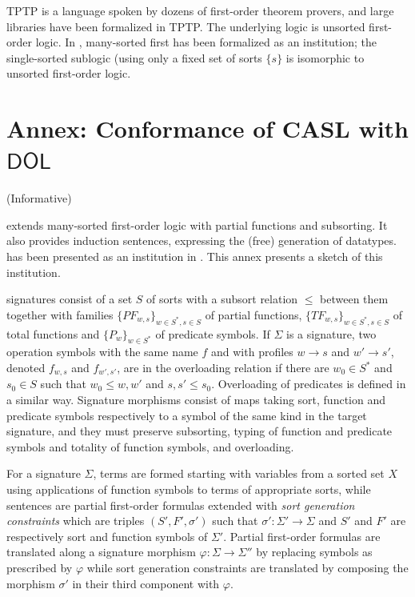 \documentclass[10pt,fleqn,final]{scrreprt}
\newcommand*{\DOL}{\ensuremath{\mathsf{DOL}}\xspace}
\newcommand{\informative}[0]{{\begin{center}{\Large{(Informative})}\end{center}} \bigskip}
\newcommand{\infannex}[1]{ \chapter{Annex: #1}  \informative }
\newenvironment{definitions}[0]{\medskip }{}
\begin{document}
\begin{definitions}
TPTP \cite{TPTP,DBLP:conf/cade/SutcliffeSY94,DBLP:journals/jar/Sutcliffe09}
is a language spoken by dozens of first-order theorem provers,
and large libraries have been formalized in TPTP.
The underlying logic is unsorted first-order logic. In 
\cite{GoguenBurstall92}, many-sorted first has been formalized as
an institution; the single-sorted sublogic (using only a fixed
set of sorts $\{s\}$ is isomorphic to unsorted first-order logic.

\infannex{Conformance of CASL with \DOL}\label{a:casl}


\CASL \cite{CASL-RM} extends many-sorted first-order logic with
partial functions and subsorting.  It also provides induction
sentences, expressing the (free) generation of datatypes.  \CASL has
been presented as an institution in \cite{Mossakowski02,CASL-RM}. This annex presents
a sketch of this institution.

\CASL signatures consist of a set $S$ of sorts with a subsort relation $\leq$ between them
together with
families $\{PF_{w,s}\}_{w\in S^*, s\in S}$ of partial functions,
$\{TF_{w,s}\}_{w\in S^*, s\in S}$ of total functions and
$\{P_w\}_{w\in S^*}$ of predicate symbols. 
If $\Sigma$ is a signature, 
two operation symbols with the same name $f$ and with profiles
$w\rightarrow s$ and $w'\rightarrow s'$, denoted $f_{w,s}$ and $f_{w',s'}$, are in the
overloading relation if there are $w_0\in S^*$ and $s_0\in S$ such
that $w_0\leq w, w'$ and $s,s' \leq s_0$. Overloading of predicates is defined in a similar way.
Signature morphisms consist of maps taking sort, function and predicate symbols
respectively to a symbol of the same kind in the target signature, and they 
must preserve subsorting, typing of function and predicate symbols and totality of function symbols,
 and overloading. 

For a signature $\Sigma$, terms are formed starting with
variables from a sorted set $X$ using 
applications of function symbols to terms of appropriate sorts, while
sentences are partial first-order formulas extended with
\emph{sort generation constraints} which are triples $(S', F', \sigma')$ such that 
$\sigma':\Sigma'\rightarrow\Sigma$ and $S'$ and $F'$ are respectively sort and function symbols of
$\Sigma'$. 
Partial first-order formulas are translated along a signature morphism 
$\varphi:\Sigma\rightarrow\Sigma''$ by replacing symbols as prescribed by $\varphi$
while sort generation constraints are translated by
composing the morphism $\sigma'$ in their third component with $\varphi$.


\end{definitions}
\end{document}
